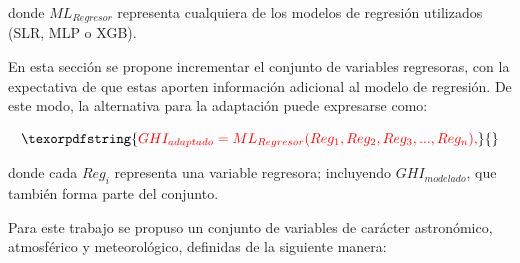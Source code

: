 \documentclass[letterpaper,12pt, twoside]{report}
\providecommand{\DIFdeltex}[1]{{\protect\color{red} \scriptsize #1}} %
\providecommand{\DIFdel}[1]{\texorpdfstring{\DIFdeltex{#1}}{}} %
\begin{document}
\DIFdel{donde $ML_{Regresor}$ representa cualquiera de los modelos de regresión utilizados (SLR, MLP o XGB). 
}%

\DIFdel{En esta sección se propone incrementar el conjunto de variables regresoras, con la expectativa de que estas aporten información adicional al modelo de regresión. De este modo, la alternativa para la adaptación puede expresarse como:
}%

\begin{displaymath}
\DIFdel{GHI_{adaptado} = ML_{Regresor}(Reg_{1}, Reg_{2}, Reg_{3},..., Reg_{n}),
}\end{displaymath}%

\DIFdel{donde cada $Reg_{i}$ representa una variable regresora; incluyendo $GHI_{modelado}$, que también forma parte del conjunto.
}%

\DIFdel{Para este trabajo se propuso un conjunto de variables de carácter astronómico, atmosférico y meteorológico, definidas de la siguiente manera:
}%
\end{document}
